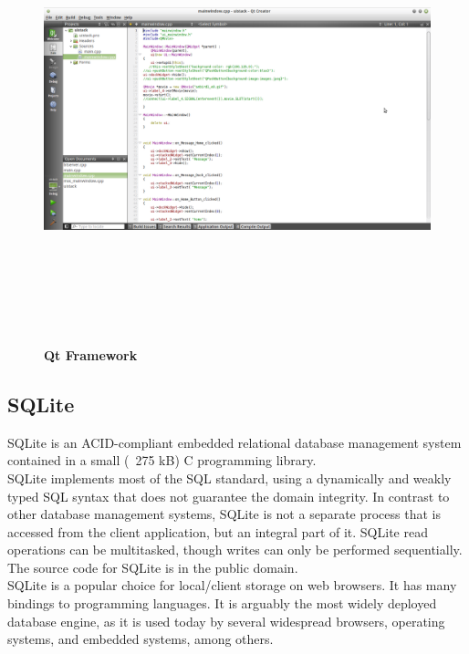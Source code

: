 \begin{figure}[H]
  \centering
    \includegraphics[height= 13cm, width=17cm]{project/images/qt}
  \caption{\textbf{Qt Framework}}
\end{figure}
\newpage
\subsection{SQLite}
\hspace*{0.82cm}SQLite is an ACID-compliant embedded relational database management system contained in a small (~275 kB) C 
programming library.\\[0.5cm]
\hspace*{0.82cm}SQLite implements most of the SQL standard, using a dynamically and weakly typed SQL syntax that does not 
guarantee the domain integrity. In contrast to other database management systems, SQLite is not a separate process that is accessed 
from the client application, but an integral part of it. SQLite read operations can be multitasked, though writes can only be 
performed sequentially. The source code for SQLite is in the public domain.\\[0.5cm]
\hspace*{0.82cm}SQLite is a popular choice for local/client storage on web browsers. It has many bindings to programming 
languages. It is arguably the most widely deployed database engine, as it is used today by several widespread browsers, operating 
systems, and embedded systems, among others.

